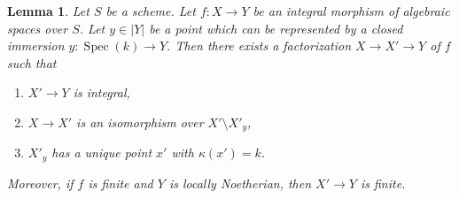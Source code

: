 \documentclass[10pt,a4paper]{amsart}
\theoremstyle{plain}
\newtheorem{lemma}[subsection]{Lemma}
\theoremstyle{definition}
\theoremstyle{remark}
\numberwithin{equation}{subsection}
\def\Spec{\mathop{\mathrm{Spec}}}
\begin{document}
\begin{lemma}
\label{lemma-construct-glueing}
Let $S$ be a scheme. Let $f : X \to Y$ be an integral morphism
of algebraic spaces over $S$.
Let $y \in |Y|$ be a point which can be represented by a closed immersion
$y : \Spec(k) \to Y$. Then there exists
a factorization $X \to X' \to Y$ of $f$ such that
\begin{enumerate}
\item $X' \to Y$ is integral,
\item $X \to X'$ is an isomorphism over $X' \setminus X'_y$,
\item $X'_y$ has a unique point $x'$ with $\kappa(x') = k$.
\end{enumerate}
Moreover, if $f$ is finite and $Y$ is locally Noetherian, then
$X' \to Y$ is finite.
\end{lemma}
\end{document}
